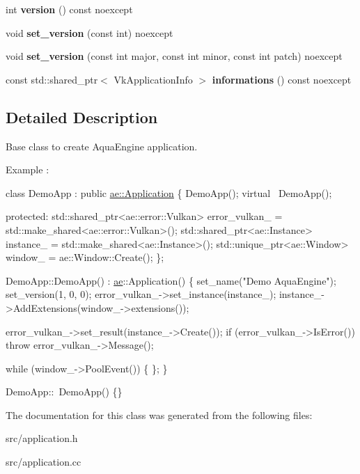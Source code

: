 \begin{DoxyCompactItemize}
int {\bfseries version} () const noexcept
\item 
\hypertarget{classae_1_1_application_a7911bcd7ef75ee1bdce9d783b5d9577b}{}\label{classae_1_1_application_a7911bcd7ef75ee1bdce9d783b5d9577b} 
void {\bfseries set\+\_\+version} (const int) noexcept
\item 
\hypertarget{classae_1_1_application_aa9c90bf2ce938a0861254f9ed656a68f}{}\label{classae_1_1_application_aa9c90bf2ce938a0861254f9ed656a68f} 
void {\bfseries set\+\_\+version} (const int major, const int minor, const int patch) noexcept
\item 
\hypertarget{classae_1_1_application_a430877054b3f5cb743b3d8541a0a37e8}{}\label{classae_1_1_application_a430877054b3f5cb743b3d8541a0a37e8} 
const std\+::shared\+\_\+ptr$<$ Vk\+Application\+Info $>$ {\bfseries informations} () const noexcept
\end{DoxyCompactItemize}


\subsection{Detailed Description}
Base class to create Aqua\+Engine application. 

Example \+:


\begin{DoxyCode}
\textcolor{keyword}{class }DemoApp : \textcolor{keyword}{public} \hyperlink{classae_1_1_application}{ae::Application} \{
    DemoApp();
    \textcolor{keyword}{virtual} ~DemoApp();

   \textcolor{keyword}{protected}:
    std::shared\_ptr<ae::error::Vulkan> error\_vulkan\_ =
        std::make\_shared<ae::error::Vulkan>();
    std::shared\_ptr<ae::Instance> instance\_ =
    std::make\_shared<ae::Instance>();
    std::unique\_ptr<ae::Window> window\_ = ae::Window::Create();
\};

DemoApp::DemoApp() : \hyperlink{namespaceae}{ae}::Application() \{
    set\_name(\textcolor{stringliteral}{"Demo AquaEngine"});
    set\_version(1, 0, 0);
    error\_vulkan\_->set\_instance(instance\_);
    instance\_->AddExtensions(window\_->extensions());

    error\_vulkan\_->set\_result(instance\_->Create());
    \textcolor{keywordflow}{if} (error\_vulkan\_->IsError()) \textcolor{keywordflow}{throw} error\_vulkan\_->Message();

    \textcolor{keywordflow}{while} (window\_->PoolEvent()) \{
    \};
\}

DemoApp::~DemoApp() \{\}
\end{DoxyCode}
 

The documentation for this class was generated from the following files\+:\begin{DoxyCompactItemize}
\item 
src/application.\+h\item 
src/application.\+cc\end{DoxyCompactItemize}
